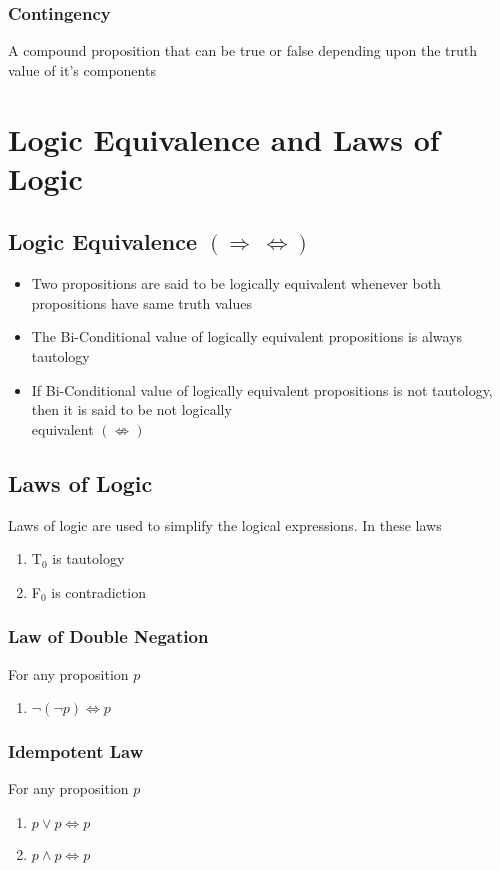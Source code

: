 \documentclass{article}
\begin{document}
	\subsubsection{Contingency}
	A compound proposition that can be true or false depending upon the truth value of it's components

	\section{Logic Equivalence and Laws of Logic}
	\subsection{Logic Equivalence $(\Rightarrow ~ \Leftrightarrow)$}
	\begin{itemize}
		\item Two propositions are said to be logically equivalent whenever both propositions have same
			truth values
		\item The Bi-Conditional value of logically equivalent propositions is always tautology
		\item If Bi-Conditional value of logically equivalent propositions is not tautology, then it is
			said to be not logically \\ equivalent $(\not\Leftrightarrow)$
	\end{itemize}

	\subsection{Laws of Logic}
	Laws of logic are used to simplify the logical expressions. In these laws
	\begin{enumerate}[label=\roman*)]
		\item T$_0$ is tautology
		\item F$_0$ is contradiction
	\end{enumerate}

	\subsubsection{Law of Double Negation}
	For any proposition $p$
	\begin{enumerate}[label=\roman*)]
		\item $\neg(\neg p)\Leftrightarrow p$
	\end{enumerate}

	\subsubsection{Idempotent Law}
	For any proposition $p$
	\begin{enumerate}[label=\roman*)]
		\item $p\lor p\Leftrightarrow p$
		\item $p\land p\Leftrightarrow p$
	\end{enumerate}
\end{document}
